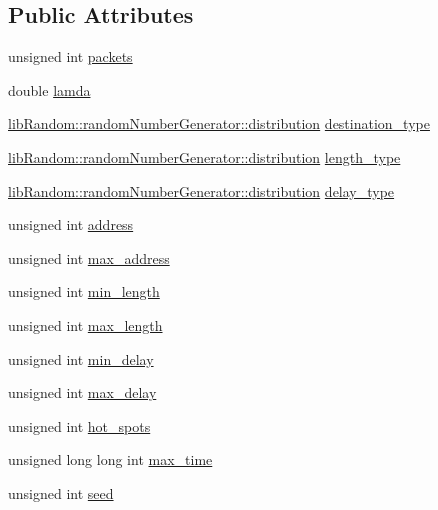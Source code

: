 \subsection*{Public Attributes}
\begin{CompactItemize}
\item 
unsigned int \hyperlink{classGenericRPG_f0b3d6cc42470254870cd9a919056b05}{packets}
\item 
double \hyperlink{classGenericRPG_408cef6ff9d8c783ca9825101f7a9718}{lamda}
\item 
\hyperlink{classlibRandom_1_1randomNumberGenerator_3bfd56b7b47f4593167e59916a555562}{libRandom::randomNumberGenerator::distribution} \hyperlink{classGenericRPG_1285c700fa0c82d5d79bba983e0fb2c3}{destination\_\-type}
\item 
\hyperlink{classlibRandom_1_1randomNumberGenerator_3bfd56b7b47f4593167e59916a555562}{libRandom::randomNumberGenerator::distribution} \hyperlink{classGenericRPG_db9b1577e85789d95062f9e75d45f183}{length\_\-type}
\item 
\hyperlink{classlibRandom_1_1randomNumberGenerator_3bfd56b7b47f4593167e59916a555562}{libRandom::randomNumberGenerator::distribution} \hyperlink{classGenericRPG_4b27f64374861ba3e2d57451514908f8}{delay\_\-type}
\item 
unsigned int \hyperlink{classGenericRPG_12a401de0099f5d1e2486886d3a99f0f}{address}
\item 
unsigned int \hyperlink{classGenericRPG_ad6fb2a002945d2de4a924bd872031cc}{max\_\-address}
\item 
unsigned int \hyperlink{classGenericRPG_c149370e5d8291090e067e86b1bd5d6d}{min\_\-length}
\item 
unsigned int \hyperlink{classGenericRPG_68d1f82964a4b5c87dd69628912b673f}{max\_\-length}
\item 
unsigned int \hyperlink{classGenericRPG_dbc8b0ba3301646835680aabb98e37bd}{min\_\-delay}
\item 
unsigned int \hyperlink{classGenericRPG_47f854be66ca4cbd5b08aa5c1786bb48}{max\_\-delay}
\item 
unsigned int \hyperlink{classGenericRPG_082010fc167cacf838026859b9b5d3c8}{hot\_\-spots}
\item 
unsigned long long int \hyperlink{classGenericRPG_f306e29286f956ddf0cb021cdd435e93}{max\_\-time}
\item 
unsigned int \hyperlink{classGenericRPG_6a09dde0d73a3d1d89187dc7f0dccc8b}{seed}
\end{CompactItemize}


